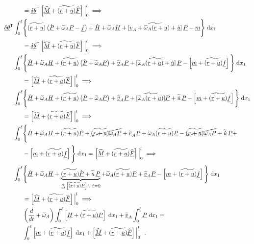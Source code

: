 \documentclass[12pt,a4paper,oneside,english]{abntex2} %
\newcommand{\vect}[1]{\underline{#1}}
\def\til#1{\widetilde{#1}}
\def\lb{\left[}
\def\rb{\right]}
\def\lp{\left(}
\def\rp{\right)}
\def\T{\mathsf{T}}
\def\xo{x_1}
\def\r{\vect{r}}
\def\rdot{\dot{\r}}
\def\u{\vect{u}}
\def\udot{\dot{\u}}
\def\vA{\vect{v}_A}
\def\omAtil{\til{\omega}_A}
\def\P{\vect{P}}
\def\Pdot{\dot{\P}}
\def\Hv{\vect{H}}
\def\Hvdot{\dot{\Hv}}
\def\F{\vect{F}}
\def\Fhat{\widehat{\F}}
\def\M{\vect{M}}
\def\Mhat{\widehat{\M}}
\def\f{\vect{f}}
\def\m{\vect{m}}
\def\zv{\vect{0}}
\def\intl{\int_{0}^{\ell}}
\def\d{\textnormal{d}}
\begin{document}
{\begin{align}
    &= \vect{\delta\theta}^\T \lb \Mhat + \til{\lp\r+\u\rp}\Fhat \rb \Big|_{0}^{l} \implies 
    \nonumber \\
    \vect{\delta\theta}^\T \intl &\Biggl\{\Biggr. \til{\lp\r+\u\rp} \lp\Pdot+\omAtil\P-\f\rp + \Hvdot+\omAtil\Hv+\til{\lb\vA+\omAtil(\r+\u)+\udot\rb}\,\P-\m \Biggl.\Biggr\}\;\d \xo \nonumber \\ 
    &= \vect{\delta\theta}^\T \lb \Mhat + \til{\lp\r+\u\rp}\Fhat \rb \Big|_{0}^{l} \implies 
    \nonumber \\
    \intl &\Biggl\{\Biggr. \Hvdot + \omAtil\Hv + \til{\lp\r+\u\rp} \lp\Pdot+\omAtil\P\rp + \til{\vect{v}}_A\P + \til{\lb\omAtil(\r+\u)+\udot\rb}\,\P - \lb \m + \til{\lp\r+\u\rp}\f \rb \Biggl.\Biggr\}\;\d \xo \nonumber \\ 
    &= \lb \Mhat + \til{\lp\r+\u\rp}\Fhat \rb \Big|_{0}^{l} \implies 
    \nonumber \\
    \intl &\Biggl\{\Biggr. \Hvdot + \omAtil\Hv + \til{\lp\r+\u\rp} \lp\Pdot+\omAtil\P\rp + \til{\vect{v}}_A\P + \til{\lb\omAtil(\r+\u)\rb}\P + \til{\dot{u}}\,\P - \lb \m + \til{\lp\r+\u\rp}\f \rb \Biggl.\Biggr\}\;\d \xo \nonumber \\
    &= \lb \Mhat + \til{\lp\r+\u\rp}\Fhat \rb \Big|_{0}^{l} \implies 
    \nonumber \\
    \intl &\Biggl\{\Biggr. \Hvdot + \omAtil\Hv + \til{\lp\r+\u\rp}\Pdot + \cancel{\til{\lp\r+\u\rp}\omAtil\P} + \til{\vect{v}}_A\P + \omAtil\til{\lp\r+\u\rp}\P - \cancel{\til{\lp\r+\u\rp}\omAtil\P} + \til{\dot{u}}\,\P + \nonumber \\ & - \lb \m + \til{\lp\r+\u\rp}\f \rb \Biggl.\Biggr\}\;\d \xo
    = \lb \Mhat + \til{\lp\r+\u\rp}\Fhat \rb \Big|_{0}^{l} \implies 
    \nonumber \\
    \intl &\Biggl\{\Biggr. \Hvdot + \omAtil\Hv + \underbrace{\til{\lp\r+\u\rp}\Pdot + \til{\dot{u}}\,\P}_{\frac{d}{dt}\lb\til{\lp\r+\u\rp}\P\rb \,\because\, \rdot=\zv} + \omAtil\til{\lp\r+\u\rp}\P + \til{\vect{v}}_A\P - \lb \m + \til{\lp\r+\u\rp}\f \rb \Biggl.\Biggr\}\;\d \xo \nonumber \\
    &= \lb \Mhat + \til{\lp\r+\u\rp}\Fhat \rb \Big|_{0}^{l} \implies 
    \nonumber \\
    & \lp \frac{d}{dt} + \omAtil \rp \intl \lb \Hv + \til{\lp\r+\u\rp}\P \rb \;\d\xo + \til{\vect{v}}_A\intl \P \;\d\xo = 
    \nonumber \\
    & \intl \lb \m + \til{\lp\r+\u\rp}\f \rb \;\d\xo + \lb \Mhat + \til{\lp\r+\u\rp}\Fhat \rb \Big|_{0}^{l} \ \ .
    \label{eq:hamilton_lagrange_rigid_deltatheta}
\end{align}
}
\end{document}
